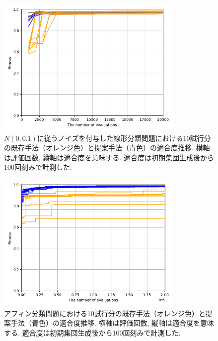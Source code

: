 \documentclass[11pt,oneside,openany,report]{jsbook}
\begin{document}
\begin{figure}[H]
  \centering
  \includegraphics[width=9cm]{exp/noisy_linear_classification.png}
  \caption{$N(0,0.1)$に従うノイズを付与した線形分類問題における10試行分の既存手法（オレンジ色）と提案手法（青色）の適合度推移. 横軸は評価回数, 縦軸は適合度を意味する. 適合度は初期集団生成後から100回刻みで計測した.}
  \label{fig:exp:result:noisy_linear_classification}
\end{figure}

\begin{figure}[H]
  \centering
  \includegraphics[width=9cm]{exp/affine_classification.png}
  \caption{アフィン分類問題における10試行分の既存手法（オレンジ色）と提案手法（青色）の適合度推移. 横軸は評価回数, 縦軸は適合度を意味する. 適合度は初期集団生成後から100回刻みで計測した.}
  \label{fig:exp:result:affine_classification}
\end{figure}
\end{document}
